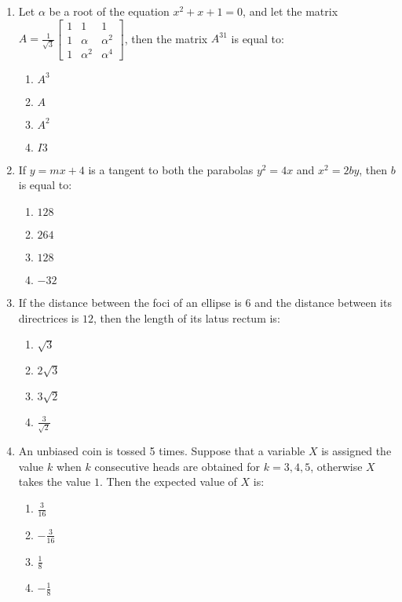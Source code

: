 \documentclass{article}
\begin{document}
\begin{enumerate}
\item Let $\alpha$ be a root of the equation $x^2 + x + 1 = 0$, and let the matrix $A = \frac{1}{\sqrt{3}} 
\begin{bmatrix}
1 & 1 & 1 \\
1 & \alpha & \alpha^2 \\
1 & \alpha^2 & \alpha^4
\end{bmatrix}$, then the matrix $A^{31}$ is equal to:  
\begin{enumerate}
    \item $A^3$
    \item $A$
    \item $A^2$
    \item $I3$
\end{enumerate}

\item If $y = mx + 4$ is a tangent to both the parabolas $y^2 = 4x$ and $x^2 = 2by$, then $b$ is equal to:  

\begin{enumerate}
    \item $128$
    \item $264$
    \item $128$
    \item $-32$
\end{enumerate}

\item If the distance between the foci of an ellipse is $6$ and the distance between its directrices is $12$, then the length of its latus rectum is:  

\begin{enumerate}
    \item $\sqrt{3}$
    \item $2\sqrt{3}$
    \item $3\sqrt{2}$
    \item $\frac{3}{\sqrt{2}}$
\end{enumerate}

\item An unbiased coin is tossed 5 times. Suppose that a variable $X$ is assigned the value $k$ when $k$ consecutive heads are obtained for $k = 3, 4, 5$, otherwise $X$ takes the value $1$. Then the expected value of $X$ is:  

\begin{enumerate}
    \item $\frac{3}{16}$
    \item $-\frac{3}{16}$
    \item $\frac{1}{8}$
    \item $-\frac{1}{8}$
\end{enumerate}


\end{enumerate}
\end{document}
